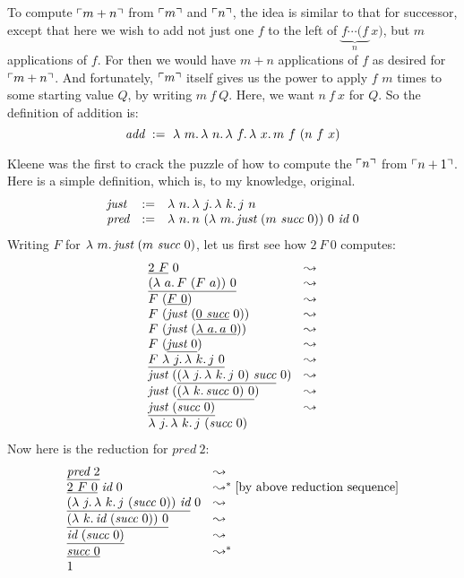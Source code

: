   To compute $\ulcorner m+n \urcorner$ from $\ulcorner m \urcorner$ and $\ulcorner n \urcorner$, the idea is similar to that for successor, except
that here we wish to add not just one $f$ to the left of $\underbrace{f \cdots (f }_{n}\ x)$, but $m$ applications of $f$.  For
then we would have $m+n$ applications of $f$ as desired for $\ulcorner m+n \urcorner$.  And fortunately, $\ulcorner m \urcorner$ itself gives us the power
to apply $f$ $m$ times to some starting value $Q$, by writing $m\ f\ Q$.  Here, we want $n\ f\ x$ for $Q$.  So the definition
of addition is:
\[
\textit{add} \ := \ \lam{m}{\lam{n}{\lam{f}{\lam{x}{m\ f\ (n\ f\ x)}}}}
\]

 Kleene was the first to crack the puzzle of how to compute the $\ulcorner n \urcorner$ from $\ulcorner n+1 \urcorner$.
Here is a simple definition, which is, to my knowledge, original.  
\[
\begin{array}{lll}
\textit{just} & := & \lam{n}{\lam{j}{\lam{k}{j\ n}}} \\
\textit{pred} & := & \lam{n}{n\ (\lam{m}{\textit{just}\ (m\ \textit{succ}\ 0)})\ 0\ \textit{id}\ 0}
\end{array}
\]
\noindent Writing $F$ for $\lam{m}{\textit{just}\ (m\ \textit{succ}\ 0)}$, let us first see how $2\ F\ 0$ computes:
\[
\begin{array}{ll}
  \underline{2\ F}\ 0 & \leadsto \\
  \underline{(\lam{a}{F\ (F\ a)})\ 0} & \leadsto \\
  F\ (\underline{F\ 0}) & \leadsto \\
  F\ (\textit{just}\ (\underline{0\ \textit{succ}}\ 0)) & \leadsto \\
  F\ (\textit{just}\ (\underline{\lam{a}{a}\ 0})) & \leadsto \\
  F\ (\underline{\textit{just}\ 0}) & \leadsto \\
  \underline{F\ \lam{j}{\lam{k}{j\ 0}}} & \leadsto \\    
  \textit{just}\ (\underline{(\lam{j}{\lam{k}{j\ 0}})\ \textit{succ}}\ 0) & \leadsto \\
  \textit{just}\ (\underline{(\lam{k}{\textit{succ}\ 0})\ 0}) & \leadsto \\
  \underline{\textit{just}\ (\textit{succ}\ 0)} & \leadsto \\
  \lam{j}{\lam{k}{j\ (\textit{succ}\ 0)}} & \ 
\end{array}
\]
\noindent Now here is the reduction for $\textit{pred}\ 2$:
\[
\begin{array}{ll}
  \underline{\textit{pred}\ 2} & \leadsto \\
  \underline{2\ F\ 0}\ \textit{id}\ 0 & \leadsto^* \textnormal{[by above reduction sequence]}\\
  \underline{(\lam{j}{\lam{k}{j\ (\textit{succ}\ 0)}})\ \textit{id}}\ 0 & \leadsto \\
  \underline{(\lam{k}{\textit{id}\ (\textit{succ}\ 0)})\ 0} & \leadsto \\
  \underline{\textit{id}\ (\textit{succ}\ 0)} & \leadsto \\
  \underline{\textit{succ}\ 0} & \leadsto^* \\
  1 &\ 
\end{array}
\]
  

